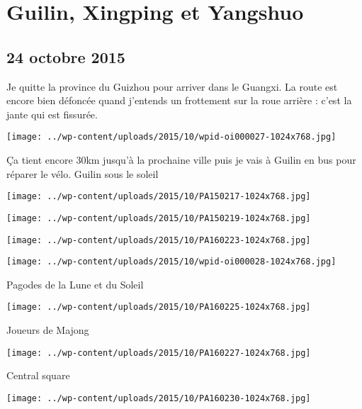 \chapter{Guilin, Xingping et Yangshuo}
\section*{24 octobre 2015}
Je quitte la province du Guizhou pour arriver dans le Guangxi. La route est encore bien défoncée quand j'entends un frottement sur la roue arrière : c'est la jante qui est fissurée. \newline
 \newline
\centerline{\texttt{[image: ../wp-content/uploads/2015/10/wpid-oi000027-1024x768.jpg]} } 
 \newline
 Ça tient encore 30km jusqu'à la prochaine ville puis je vais à Guilin en bus pour réparer le vélo.  \newline
 Guilin sous le soleil \newline
 \newline
\centerline{\texttt{[image: ../wp-content/uploads/2015/10/PA150217-1024x768.jpg]} } 
 \newline
 \newline
\centerline{\texttt{[image: ../wp-content/uploads/2015/10/PA150219-1024x768.jpg]} } 
 \newline
 \newline
\centerline{\texttt{[image: ../wp-content/uploads/2015/10/PA160223-1024x768.jpg]} } 
 \newline
 \newline
\centerline{\texttt{[image: ../wp-content/uploads/2015/10/wpid-oi000028-1024x768.jpg]} } 
 \newline
 Pagodes de la Lune et du Soleil \newline
 \newline
\centerline{\texttt{[image: ../wp-content/uploads/2015/10/PA160225-1024x768.jpg]} } 
 \newline
 Joueurs de Majong \newline
 \newline
\centerline{\texttt{[image: ../wp-content/uploads/2015/10/PA160227-1024x768.jpg]} } 
 \newline
 Central square \newline
 \newline
\centerline{\texttt{[image: ../wp-content/uploads/2015/10/PA160230-1024x768.jpg]} } 
